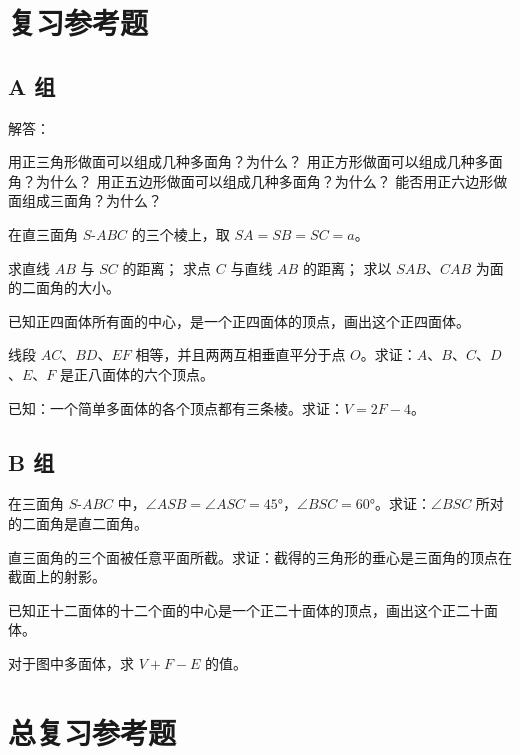 \chapter*{复习参考题}
\section*{A 组}
\begin{question}
  \item 解答：
  \begin{tasks}
    \task 用正三角形做面可以组成几种多面角？为什么？
    \task 用正方形做面可以组成几种多面角？为什么？
    \task 用正五边形做面可以组成几种多面角？为什么？
    \task 能否用正六边形做面组成三面角？为什么？
  \end{tasks}
  \item 在直三面角 $S\text{-}ABC$ 的三个棱上，取 $SA=SB=SC=a$。
  \begin{tasks}
    \task 求直线 $AB$ 与 $SC$ 的距离；
    \task 求点 $C$ 与直线 $AB$ 的距离；
    \task 求以 $SAB$、$CAB$ 为面的二面角的大小。
  \end{tasks}
  \item 已知正四面体所有面的中心，是一个正四面体的顶点，画出这个正四面体。
  \item 线段 $AC$、$BD$、$EF$ 相等，并且两两互相垂直平分于点 $O$。求证：$A$、$B$、$C$、$D$、$E$、$F$ 是正八面体的六个顶点。
  \item 已知：一个简单多面体的各个顶点都有三条棱。求证：$V=2F-4$。
\end{question}
\section*{B 组}
\begin{question}
  \item 在三面角 $S\text{-}ABC$ 中，$\angle ASB=\angle ASC=\ang{45}$，$\angle BSC=\ang{60}$。求证：$\angle BSC$ 所对的二面角是直二面角。
  \item 直三面角的三个面被任意平面所截。求证：截得的三角形的垂心是三面角的顶点在截面上的射影。
  \item 已知正十二面体的十二个面的中心是一个正二十面体的顶点，画出这个正二十面体。
  \item 对于图中多面体，求 $V+F-E$ 的值。
\end{question}

\chapter*{总复习参考题}
